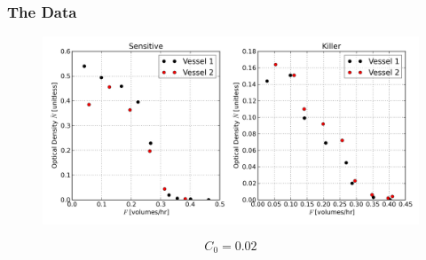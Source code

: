 \documentclass{beamer}
\begin{document}
\begin{frame}
  \frametitle{The Data}
  \begin{figure}[H]
    \centering
      \includegraphics[width=1.0\textwidth]{../doc/images/data.png}
  \end{figure}
  $$C_0 = 0.02$$
\end{frame}
\end{document}
